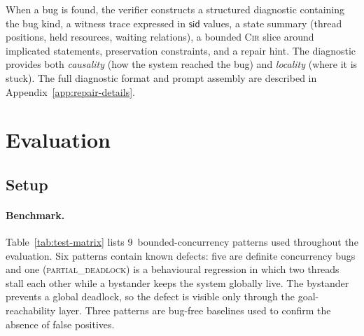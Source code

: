 \documentclass{article}
\begin{document}
When a bug is found, the verifier constructs a structured diagnostic containing the bug kind, a witness trace expressed in $\mathsf{sid}$ values, a state summary (thread positions, held resources, waiting relations), a bounded \textsc{Cir} slice around implicated statements, preservation constraints, and a repair hint.  The diagnostic provides both \emph{causality} (how the system reached the bug) and \emph{locality} (where it is stuck). The full diagnostic format and
prompt assembly are described in Appendix~\ref{app:repair-details}.

\section{Evaluation}
\label{sec:evaluation}

\subsection{Setup}
\label{subsec:setup}

\paragraph{Benchmark.}
Table~\ref{tab:test-matrix} lists 9~bounded-concurrency patterns used throughout the evaluation. Six patterns contain known defects: five are definite concurrency bugs and one (\textsc{partial\_deadlock}) is a behavioural regression in which two threads stall each other while a bystander keeps the system globally live. The bystander prevents a global deadlock, so the defect is visible only through the goal-reachability layer. Three patterns are bug-free baselines used to confirm the absence of false positives.
\end{document}
